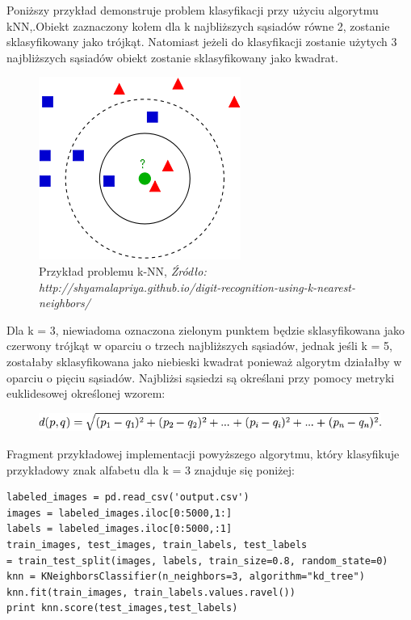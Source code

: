 \documentclass[brudnopis]{xmgr}
\begin{document}
Poniższy przykład demonstruje problem klasyfikacji przy użyciu algorytmu kNN,.Obiekt zaznaczony kołem dla k najbliższych sąsiadów równe 2, zostanie sklasyfikowany jako trójkąt. Natomiast jeżeli do klasyfikacji zostanie użytych 3 najbliższych sąsiadów obiekt zostanie sklasyfikowany jako kwadrat.

\begin{figure}[!tbh]
\centering
\includegraphics[width=.4\hsize]{fig/knn}
\caption{Przykład problemu k-NN, \emph{Źródło: http://shyamalapriya.github.io/digit-recognition-using-k-nearest-neighbors/}}
\end{figure}
\newpage

Dla k = 3, niewiadoma oznaczona zielonym punktem będzie sklasyfikowana jako czerwony trójkąt w oparciu o trzech najbliższych sąsiadów, jednak jeśli k = 5, zostałaby sklasyfikowana jako niebieski kwadrat ponieważ algorytm działałby w oparciu o pięciu sąsiadów. Najbliżsi sąsiedzi są określani przy pomocy metryki euklidesowej określonej wzorem:

\begin{figure}[!tbh]
\centering
\includegraphics[width=1\hsize]{fig/knn-wzor}
\end{figure}

Fragment przykładowej implementacji powyższego algorytmu, który klasyfikuje przykładowy znak alfabetu dla k = 3 znajduje się poniżej:

\begin{verbatim}
labeled_images = pd.read_csv('output.csv')
images = labeled_images.iloc[0:5000,1:]
labels = labeled_images.iloc[0:5000,:1]
train_images, test_images, train_labels, test_labels 
= train_test_split(images, labels, train_size=0.8, random_state=0)
knn = KNeighborsClassifier(n_neighbors=3, algorithm="kd_tree")
knn.fit(train_images, train_labels.values.ravel())
print knn.score(test_images,test_labels)
\end{verbatim}
\end{document}
